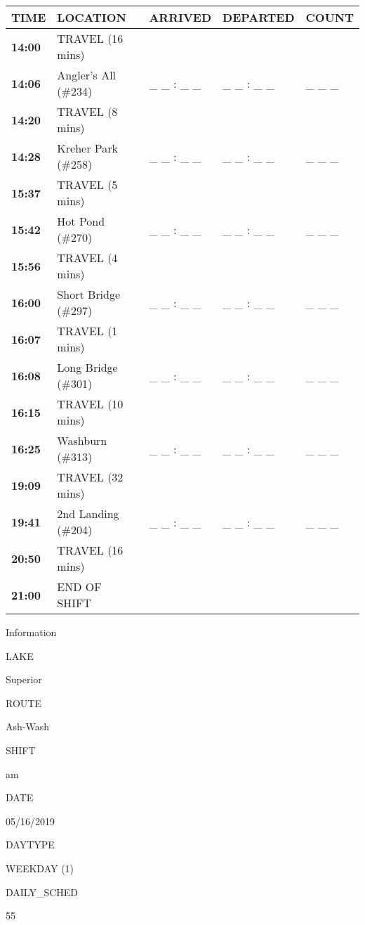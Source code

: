 \documentclass[]{article}
\begin{document}
\begin{tabular}{>{\bfseries}lllll}
\toprule
\textbf{TIME} & \textbf{LOCATION} & \textbf{ARRIVED} & \textbf{DEPARTED} & \textbf{COUNT}\\
\midrule
14:00 & TRAVEL (16 mins) &  &  & \\
14:06 & Angler's All (\#234) & \_ \_ : \_ \_ & \_ \_ : \_ \_ & \_ \_ \_\\
14:20 & TRAVEL (8 mins) &  &  & \\
14:28 & Kreher Park (\#258) & \_ \_ : \_ \_ & \_ \_ : \_ \_ & \_ \_ \_\\
15:37 & TRAVEL (5 mins) &  &  & \\
15:42 & Hot Pond (\#270) & \_ \_ : \_ \_ & \_ \_ : \_ \_ & \_ \_ \_\\
15:56 & TRAVEL (4 mins) &  &  & \\
16:00 & Short Bridge (\#297) & \_ \_ : \_ \_ & \_ \_ : \_ \_ & \_ \_ \_\\
16:07 & TRAVEL (1 mins) &  &  & \\
16:08 & Long Bridge (\#301) & \_ \_ : \_ \_ & \_ \_ : \_ \_ & \_ \_ \_\\
16:15 & TRAVEL (10 mins) &  &  & \\
16:25 & Washburn (\#313) & \_ \_ : \_ \_ & \_ \_ : \_ \_ & \_ \_ \_\\
19:09 & TRAVEL (32 mins) &  &  & \\
19:41 & 2nd Landing (\#204) & \_ \_ : \_ \_ & \_ \_ : \_ \_ & \_ \_ \_\\
20:50 & TRAVEL (16 mins) &  &  & \\
21:00 & END OF SHIFT &  &  & \\
\bottomrule
\end{tabular}\newpage

Information

LAKE

Superior

ROUTE

Ash-Wash

SHIFT

am

DATE

05/16/2019

DAYTYPE

WEEKDAY (1)

DAILY\_SCHED

55

\vspace{24pt}
\end{document}
